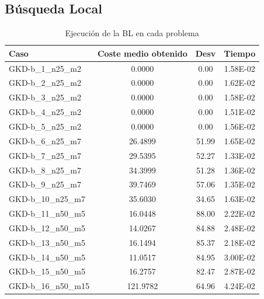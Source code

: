\subsection*{Búsqueda Local}
\begin{table}[H]
\scriptsize
\centering
\caption{Ejecución de la BL en cada problema}
\begin{tabular}{@{}lccc@{}}
\toprule
\textbf{Caso}        & \textbf{Coste medio obtenido} & \textbf{Desv} & \textbf{Tiempo} \\ \midrule
GKD-b\_1\_n25\_m2    & 0.0000                        & 0.00          & 1.58E-02        \\
GKD-b\_2\_n25\_m2    & 0.0000                        & 0.00          & 1.62E-02        \\
GKD-b\_3\_n25\_m2    & 0.0000                        & 0.00          & 1.58E-02        \\
GKD-b\_4\_n25\_m2    & 0.0000                        & 0.00          & 1.51E-02        \\
GKD-b\_5\_n25\_m2    & 0.0000                        & 0.00          & 1.56E-02        \\
GKD-b\_6\_n25\_m7    & 26.4899                       & 51.99         & 1.65E-02        \\
GKD-b\_7\_n25\_m7    & 29.5395                       & 52.27         & 1.33E-02        \\
GKD-b\_8\_n25\_m7    & 34.3999                       & 51.28         & 1.36E-02        \\
GKD-b\_9\_n25\_m7    & 39.7469                       & 57.06         & 1.35E-02        \\
GKD-b\_10\_n25\_m7   & 35.6030                       & 34.65         & 1.63E-02        \\
GKD-b\_11\_n50\_m5   & 16.0448                       & 88.00         & 2.22E-02        \\
GKD-b\_12\_n50\_m5   & 14.0267                       & 84.88         & 2.48E-02        \\
GKD-b\_13\_n50\_m5   & 16.1494                       & 85.37         & 2.18E-02        \\
GKD-b\_14\_n50\_m5   & 11.0517                       & 84.95         & 3.00E-02        \\
GKD-b\_15\_n50\_m5   & 16.2757                       & 82.47         & 2.87E-02        \\
GKD-b\_16\_n50\_m15  & 121.9782                      & 64.96         & 4.24E-02        \\

\end{tabular}
\end{table}
